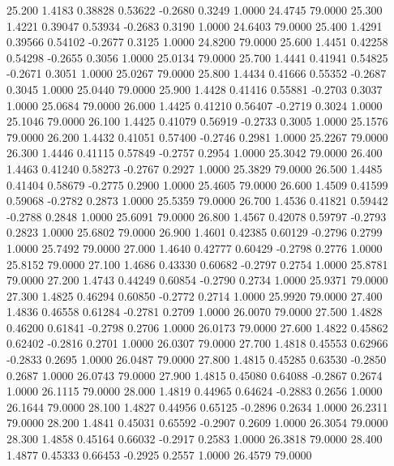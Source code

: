   25.200   1.4183   0.38828   0.53622  -0.2680   0.3249   1.0000  24.4745  79.0000
  25.300   1.4221   0.39047   0.53934  -0.2683   0.3190   1.0000  24.6403  79.0000
  25.400   1.4291   0.39566   0.54102  -0.2677   0.3125   1.0000  24.8200  79.0000
  25.600   1.4451   0.42258   0.54298  -0.2655   0.3056   1.0000  25.0134  79.0000
  25.700   1.4441   0.41941   0.54825  -0.2671   0.3051   1.0000  25.0267  79.0000
  25.800   1.4434   0.41666   0.55352  -0.2687   0.3045   1.0000  25.0440  79.0000
  25.900   1.4428   0.41416   0.55881  -0.2703   0.3037   1.0000  25.0684  79.0000
  26.000   1.4425   0.41210   0.56407  -0.2719   0.3024   1.0000  25.1046  79.0000
  26.100   1.4425   0.41079   0.56919  -0.2733   0.3005   1.0000  25.1576  79.0000
  26.200   1.4432   0.41051   0.57400  -0.2746   0.2981   1.0000  25.2267  79.0000
  26.300   1.4446   0.41115   0.57849  -0.2757   0.2954   1.0000  25.3042  79.0000
  26.400   1.4463   0.41240   0.58273  -0.2767   0.2927   1.0000  25.3829  79.0000
  26.500   1.4485   0.41404   0.58679  -0.2775   0.2900   1.0000  25.4605  79.0000
  26.600   1.4509   0.41599   0.59068  -0.2782   0.2873   1.0000  25.5359  79.0000
  26.700   1.4536   0.41821   0.59442  -0.2788   0.2848   1.0000  25.6091  79.0000
  26.800   1.4567   0.42078   0.59797  -0.2793   0.2823   1.0000  25.6802  79.0000
  26.900   1.4601   0.42385   0.60129  -0.2796   0.2799   1.0000  25.7492  79.0000
  27.000   1.4640   0.42777   0.60429  -0.2798   0.2776   1.0000  25.8152  79.0000
  27.100   1.4686   0.43330   0.60682  -0.2797   0.2754   1.0000  25.8781  79.0000
  27.200   1.4743   0.44249   0.60854  -0.2790   0.2734   1.0000  25.9371  79.0000
  27.300   1.4825   0.46294   0.60850  -0.2772   0.2714   1.0000  25.9920  79.0000
  27.400   1.4836   0.46558   0.61284  -0.2781   0.2709   1.0000  26.0070  79.0000
  27.500   1.4828   0.46200   0.61841  -0.2798   0.2706   1.0000  26.0173  79.0000
  27.600   1.4822   0.45862   0.62402  -0.2816   0.2701   1.0000  26.0307  79.0000
  27.700   1.4818   0.45553   0.62966  -0.2833   0.2695   1.0000  26.0487  79.0000
  27.800   1.4815   0.45285   0.63530  -0.2850   0.2687   1.0000  26.0743  79.0000
  27.900   1.4815   0.45080   0.64088  -0.2867   0.2674   1.0000  26.1115  79.0000
  28.000   1.4819   0.44965   0.64624  -0.2883   0.2656   1.0000  26.1644  79.0000
  28.100   1.4827   0.44956   0.65125  -0.2896   0.2634   1.0000  26.2311  79.0000
  28.200   1.4841   0.45031   0.65592  -0.2907   0.2609   1.0000  26.3054  79.0000
  28.300   1.4858   0.45164   0.66032  -0.2917   0.2583   1.0000  26.3818  79.0000
  28.400   1.4877   0.45333   0.66453  -0.2925   0.2557   1.0000  26.4579  79.0000
